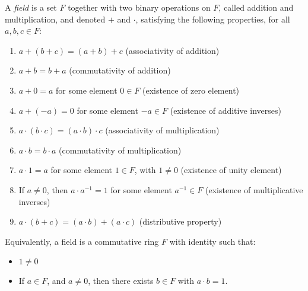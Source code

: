 \documentclass{article}
\begin{document}
A \emph{field} is a set $F$ together with two binary operations on $F$, called addition and multiplication, and denoted $+$ and $\cdot$, satisfying the following properties, for all $a,b,c \in F$:

\begin{enumerate}
\item $a + (b+c) = (a+b)+ c$ (associativity of addition)
\item $a+b = b+a$ (commutativity of addition)
\item $a+0 = a$ for some element $0 \in F$ (existence of zero element)
\item $a+(-a) = 0$ for some element $-a \in F$ (existence of additive inverses)
\item $a\cdot (b\cdot c) = (a\cdot b)\cdot c$ (associativity of multiplication)
\item $a\cdot b = b\cdot a$ (commutativity of multiplication)
\item $a\cdot 1 = a$ for some element $1 \in F$, with $1 \neq 0$ (existence of unity element)
\item If $a \neq 0$, then $a \cdot a^{-1} = 1$ for some element $a^{-1} \in F$ (existence of multiplicative inverses)
\item $a\cdot (b+c) = (a\cdot b) + (a\cdot c)$ (distributive property)
\end{enumerate}

Equivalently, a field is a commutative ring $F$ with identity such that:
\begin{itemize}
\item $1 \neq 0$
\item If $a \in F$, and $a \neq 0$, then there exists $b \in F$ with $a \cdot b = 1$.
\end{itemize}
\end{document}
